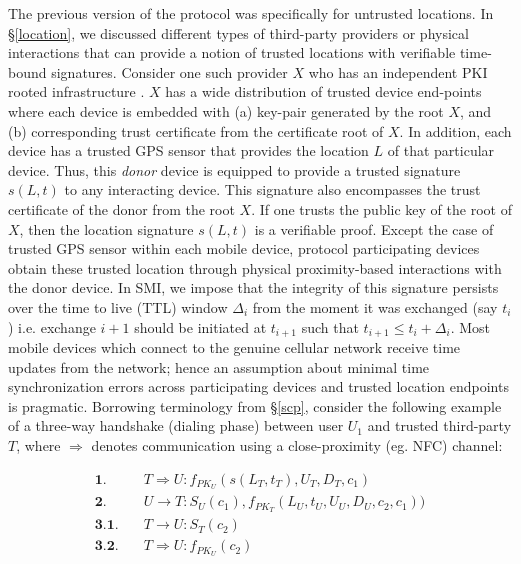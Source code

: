 \documentclass[letterpaper,twocolumn]{sig-alternate}
\begin{document}
The previous version of the protocol was specifically for untrusted locations. In \S \ref{location}, we discussed different types of third-party providers or physical interactions that can provide a notion of trusted locations with verifiable time-bound signatures. Consider one such provider $X$ who has an independent PKI rooted infrastructure \cite{herzberg2000access}. $X$ has a wide distribution of trusted device end-points where each device is embedded with (a) key-pair generated by the root $X$, and (b) corresponding trust certificate from the certificate root of $X$. In addition, each device has a trusted GPS sensor that provides the location $L$ of that particular device. Thus, this {\em donor} device is
equipped to provide a trusted signature $s(L,t)$ to any interacting device. This signature also encompasses the trust certificate of the donor from the root $X$. If one trusts the public key of the root of $X$, then the location signature $s(L,t)$ is a verifiable proof. Except the case of trusted GPS sensor within each mobile device, protocol participating devices obtain these trusted location through physical proximity-based interactions with the donor device. In SMI, we impose that the integrity of this signature persists over the time to live (TTL) window $\Delta_i$ from the moment it was exchanged (say $t_i$) i.e. exchange $i+1$ should be initiated at $t_{i+1}$ such that $t_{i+1} \leq t_i + \Delta_i$. Most mobile devices which connect to the genuine cellular network receive time updates from the network; hence an assumption about minimal time synchronization errors across participating devices and trusted location endpoints is pragmatic. Borrowing terminology from \S \ref{scp}, consider the following example of a three-way handshake (dialing phase) between user $U_1$ and trusted third-party $T$, where $\Rightarrow$ denotes communication using a close-proximity (eg. NFC) channel: 

\vspace{-2mm}
\begin{align*}
\textbf{1}.& \quad T \Rightarrow U: f_{PK_U}(s(L_{T},t_{T}),U_T,D_T,c_1) \\
\textbf{2}.& \quad U \rightarrow T: S_U(c_1),f_{PK_T}(L_U,t_U,U_U,D_U,c_2,c_1)) \\
\textbf{3.1}.& \quad T \rightarrow U: S_T(c_2) \\
\textbf{3.2}.& \quad T \Rightarrow U: f_{PK_U}(c_2) \\
\end{align*}
\vspace{-6mm}
\end{document}

